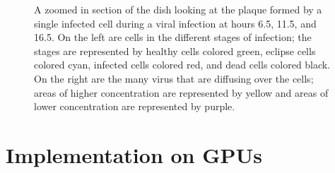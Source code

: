\begin{figure}
\begin{minipage}{0.66\linewidth}
    \vspace{0.25em}
\end{minipage}
\caption{A zoomed in section of the dish looking at the plaque formed by a single infected cell during a viral infection at hours 6.5, 11.5, and 16.5. On the left are cells in the different stages of infection; the stages are represented by healthy cells colored green, eclipse cells colored cyan, infected cells colored red, and dead cells colored black. On the right are the many virus that are diffusing over the cells; areas of higher concentration are represented by yellow and areas of lower concentration are represented by purple. \label{fig_ZoominDish}}
\end{figure}

\section{Implementation on GPUs}

